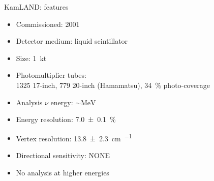 \documentclass[14pt]{beamer}
\begin{document}
\begin{frame}[t]{KamLAND: features}
	\begin{itemize}
		\item<2-> Commissioned: \num{2001}
		\item<2-> Detector medium: liquid scintillator
		\item<2-> Size: \SI{1}{\kilo\tonne}
		\item<2-> Photomultiplier tubes:\\
			\num{1325} 17-inch, \num{779} 20-inch
			(Hamamatsu), \SI{34}{\percent} photo-coverage
		\item<2-> Analysis $\nu$ energy: $\sim\si{\mega\electronvolt}$
		\item<2-> Energy resolution: \SI{7.0\pm0.1}{\percent}
		\item<2-> Vertex resolution:
			\SI{13.8\pm2.3}{\centi\meter\per{}}
		\item<3-> {\color{red}Directional sensitivity: NONE}
		\item<4-> {\color{red}No analysis at higher energies}
	\end{itemize}
\end{frame}
\end{document}
